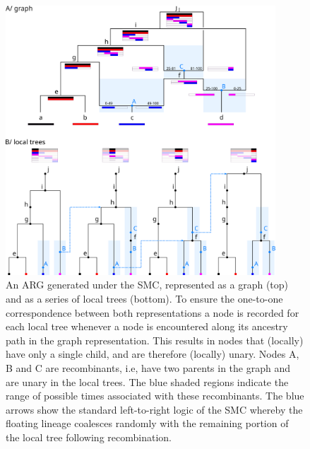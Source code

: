 \documentclass{article}
\begin{document}
\begin{figure}
\centering
\includegraphics[width=0.9\textwidth]{figures/smc_custom_2rows_area_full_hap.png}
\caption{An ARG generated under the SMC, represented as a graph (top) and as a
series of local trees (bottom). To ensure the one-to-one correspondence
between both representations a node is recorded for each local tree whenever
a node is encountered along its ancestry path in the graph representation.
This results in nodes that (locally) have only a single child, and are therefore
(locally) unary.
Nodes A, B and C are recombinants, i.e, have two parents in the graph
and are unary in the local trees. The blue shaded regions indicate
the range of possible times associated with these recombinants.
The blue arrows show the
standard left-to-right logic of the SMC whereby
the floating lineage coalesces randomly
    with the remaining portion of the local tree following recombination.
}
\label{fig:smc-unary}
\end{figure}
\end{document}
